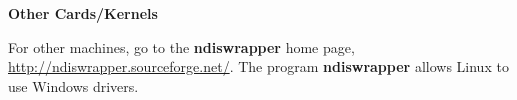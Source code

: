 \documentclass[11pt]{article}
\begin{document}
\textbf{Other Cards/Kernels}

For other machines, go to the {\bf ndiswrapper} home
page, \url{http://ndiswrapper.sourceforge.net/}.  The program {\bf
ndiswrapper} allows Linux to use Windows drivers.

% 
% 
% 
% 
% 
% 
% 
% 
% 
% 
% 
% 
% 
% 
% 
% 
% 
% 
% 
% 
% 
\end{document}
